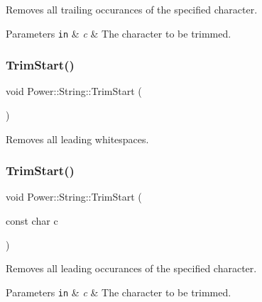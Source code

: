 Removes all trailing occurances of the specified character. 


\begin{DoxyParams}[1]{Parameters}
\mbox{\tt in}  & {\em c} & The character to be trimmed. \\
\hline
\end{DoxyParams}
\mbox{\label{class_power_1_1_string_ac83fee188935bfea5a486d135f8e39e3}} 
\subsubsection{\texorpdfstring{Trim\+Start()}{TrimStart()}\hspace{0.1cm}{\footnotesize\ttfamily [1/2]}}
{\footnotesize\ttfamily void Power\+::\+String\+::\+Trim\+Start (\begin{DoxyParamCaption}{ }\end{DoxyParamCaption})\hspace{0.3cm}{\ttfamily [inline]}}



Removes all leading whitespaces. 

\mbox{\label{class_power_1_1_string_ae4130f9754a9f1f6a2570a13429cb3d0}} 
\subsubsection{\texorpdfstring{Trim\+Start()}{TrimStart()}\hspace{0.1cm}{\footnotesize\ttfamily [2/2]}}
{\footnotesize\ttfamily void Power\+::\+String\+::\+Trim\+Start (\begin{DoxyParamCaption}\item[{const char}]{c }\end{DoxyParamCaption})\hspace{0.3cm}{\ttfamily [inline]}}



Removes all leading occurances of the specified character. 


\begin{DoxyParams}[1]{Parameters}
\mbox{\tt in}  & {\em c} & The character to be trimmed. \\
\hline
\end{DoxyParams}


